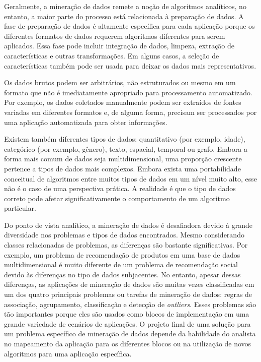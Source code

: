 Geralmente, a mineração de dados remete a noção de algoritmos analíticos, no entanto, a maior parte do processo está relacionada à preparação de dados. A fase de preparação de dados é altamente específica para cada aplicação porque os diferentes formatos de dados requerem algoritmos diferentes para serem aplicados. Essa fase pode incluir integração de dados, limpeza, extração de características e outras transformações. Em alguns casos, a seleção de características também pode ser usada para deixar os dados mais representativos.

Os dados brutos podem ser arbitrários, não estruturados ou mesmo em um formato que não é imediatamente apropriado para processamento automatizado. Por exemplo, os dados coletados manualmente podem ser extraídos de fontes variadas em diferentes formatos e, de alguma forma, precisam ser processados por uma aplicação automatizada para obter informações.

Existem também diferentes tipos de dados: quantitativo (por exemplo, idade), categórico (por exemplo, gênero), texto, espacial, temporal ou grafo. Embora a forma mais comum de dados seja multidimensional, uma proporção crescente pertence a tipos de dados mais complexos. Embora exista uma portabilidade conceitual de algoritmos entre muitos tipos de dados em um nível muito alto, esse não é o caso de uma perspectiva prática. A realidade é que o tipo de dados correto pode afetar significativamente o comportamento de um algoritmo particular.

Do ponto de vista analítico, a mineração de dados é desafiadora devido à grande diversidade nos problemas e tipos de dados encontrados. Mesmo considerando classes relacionadas de problemas, as diferenças são bastante significativas. Por exemplo, um problema de recomendação de produtos em uma base de dados multidimensional é muito diferente de um problema de recomendação social devido às diferenças no tipo de dados subjacentes. No entanto, apesar dessas diferenças, as aplicações de mineração de dados são muitas vezes classificadas em um dos quatro principais problemas ou tarefas de mineração de dados: regras de associação, agrupamento, classificação e detecção de \textit{outliers}. Esses problemas são tão importantes porque eles são usados como blocos de implementação em uma grande variedade de cenários de aplicações. O projeto final de uma solução para um problema específico de mineração de dados depende da habilidade do analista no mapeamento da aplicação para os diferentes blocos ou na utilização de novos algoritmos para uma aplicação específica.




